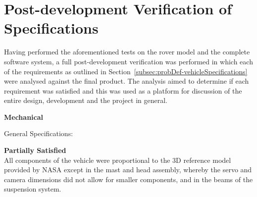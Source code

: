 \section{Post-development Verification of Specifications}
  Having performed the aforementioned tests on the rover model and the complete software system, a full post-development verification was performed in which each of the requirements as outlined in Section~\ref{subsec:probDef-vehicleSpecifications} were analysed against the final product. The analysis aimed to determine if each requirement was satisfied and this was used as a platform for discussion of the entire design, development and the project in general.
  
  \begin{itemize}
    \item \textbf{Mechanical}
    \begin{RM}
      \item General Specifications:
      \begin{RM}
        \item \textbf{Partially Satisfied}\\
        All components of the vehicle were proportional to the 3D reference model \cite{nasa3Dprint} provided by NASA except in the mast and head assembly, whereby the servo and camera dimensions did not allow for smaller components, and in the beams of the suspension system.
        

\end{RM}
\end{RM}
\end{itemize}
